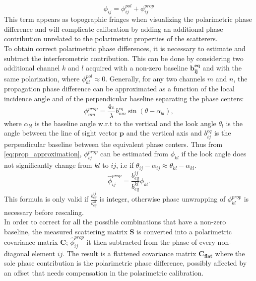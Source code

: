\begin{equation}
	\phi_{ij} = \phi_{ij}^{pol} + \phi_{ij}^{prop}
\end{equation}
This term appears as topographic fringes when visualizing the polarimetric phase difference and will complicate calibration by adding an additional phase contribution unrelated to the polarimetric properties of the scatterers.\\
To obtain correct polarimetric phase differences, it is necessary to estimate and subtract the interferometric contribution. This can be done  by considering two additional channel $k$ and $l$  acquired with  a non-zero baseline $\mathbf{b_{ij}^{eq}}$ and with the same polarization, where $\phi_{kl}^{pol} \approx 0$. Generally, for any two channels $m$ and $n$,  the propagation phase difference can be approximated as a function of the local incidence angle and of the perpendicular baseline separating the phase centers:
\begin{equation}\label{eq:prop_approximation}
		\phi_{mn}^{prop} = \frac{4\pi}{\lambda} b_{mn}^{eq} \sin(\theta - \alpha_{bl}),
\end{equation}
where $\alpha_{bl}$ is the baseline angle w.r.t to the vertical and the look angle $\theta_l$ is the angle between the line of sight vector $\mathbf{p}$ and the vertical axis and $b_{ij}^{eq}$ is the perpendicular baseline between the equivalent phase centers.
Thus from \autoref{eq:prop_approximation}, $\phi_{ij}^{prop}$ can be estimated from $\phi_{kl}$ if the look angle does not significantly change from $kl$ to $ij$, i.e if $\theta_{ij} - \alpha_{ij} \approx \theta_{kl} - \alpha_{kl}$. 
\begin{equation}
	\hat{\phi}_{ij}^{prop} = \frac{b_{eq}^{ij}}{b_{eq}^{kl}} \phi_{kl}.
\end{equation}
This formula is only valid if $\frac{b_{eq}^{ij}}{b_{eq}^{kl}}$ is integer\cite{Massonnet1996}, otherwise phase unwrapping of $\phi_{kl}^{prop}$ is necessary before rescaling.\\
In order to correct for all the possible combinations that have a non-zero baseline, the measured scattering matrix $\mathbf{S}$ is converted into a polarimetric covariance matrix $\mathbf{C}$;  $\hat{\phi}_{ij}^{prop}$ it then subtracted from the phase of every non-diagonal element $ij$. The result is a flattened covariance matrix $\mathbf{C_{flat}}$ where the sole phase contribution is the polarimetric phase difference, possibly affected by an offset that needs compensation in the polarimetric calibration.\\
